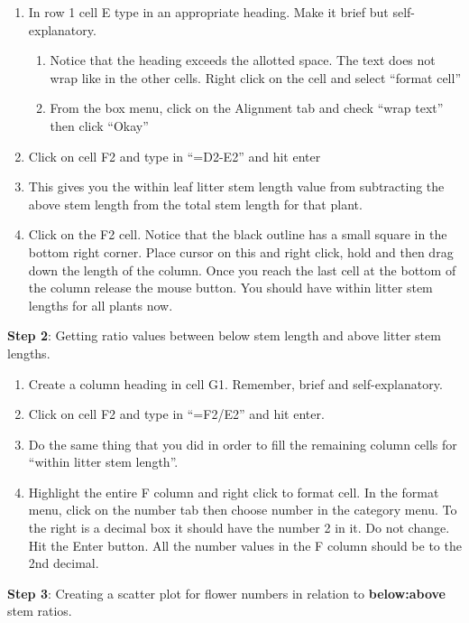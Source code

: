 \documentclass[12pt, hidelinks]{exam}
\begin{document}
\begin{enumerate}
\item
  In row 1 cell E type in an appropriate heading. Make it brief but
  self-explanatory.

  \begin{enumerate}[label=\alph*.]
  \item
    Notice that the heading exceeds the allotted space. The text does
    not wrap like in the other cells. Right click on the cell and select
    ``format cell''
  \item
    From the box menu, click on the Alignment tab and check ``wrap
    text'' then click ``Okay''
  \end{enumerate}
\item
  Click on cell F2 and type in ``=D2-E2'' and hit enter
\item
  This gives you the within leaf litter stem length value from
  subtracting the above stem length from the total stem length for that
  plant.
\item
  Click on the F2 cell. Notice that the black outline has a small square
  in the bottom right corner. Place cursor on this and right click, hold
  and then drag down the length of the column. Once you reach the last
  cell at the bottom of the column release the mouse button. You should
  have within litter stem lengths for all plants now.
\end{enumerate}

\textbf{Step 2}: Getting ratio values between below stem length and
above litter stem lengths.

\begin{enumerate}
\item
  Create a column heading in cell G1. Remember, brief and
  self-explanatory.
\item
  Click on cell F2 and type in ``=F2/E2'' and hit enter.
\item
  Do the same thing that you did in order to fill the remaining column
  cells for ``within litter stem length''.
\item
  Highlight the entire F column and right click to format cell. In the
  format menu, click on the number tab then choose number in the
  category menu. To the right is a decimal box it should have the number
  2 in it. Do not change. Hit the Enter button. All the number values in
  the F column should be to the 2nd decimal.
\end{enumerate}

\textbf{Step 3}: Creating a scatter plot for flower numbers in relation
to \textbf{below:above} stem ratios.
\end{document}

